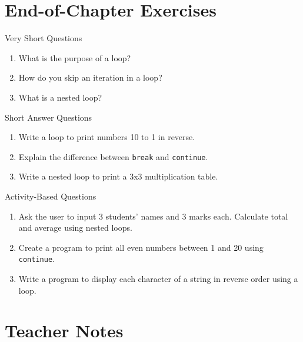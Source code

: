 \section{End-of-Chapter Exercises}

\begin{exercise}{Very Short Questions}
\begin{enumerate}
    \item What is the purpose of a loop?  
    \item How do you skip an iteration in a loop?  
    \item What is a nested loop?  
\end{enumerate}
\end{exercise}

\begin{exercise}{Short Answer Questions}
\begin{enumerate}
    \item Write a loop to print numbers 10 to 1 in reverse.  
    \item Explain the difference between \texttt{break} and \texttt{continue}.  
    \item Write a nested loop to print a 3x3 multiplication table.  
\end{enumerate}
\end{exercise}

\begin{exercise}{Activity-Based Questions}
\begin{enumerate}
    \item Ask the user to input 3 students’ names and 3 marks each. Calculate total and average using nested loops.  
    \item Create a program to print all even numbers between 1 and 20 using \texttt{continue}.  
    \item Write a program to display each character of a string in reverse order using a loop.  
\end{enumerate}
\end{exercise}

\section{Teacher Notes}

